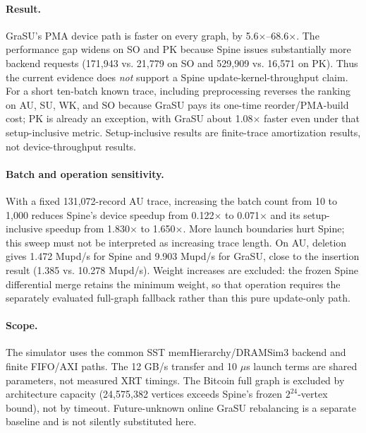 \documentclass[10pt]{article}
\begin{document}
\paragraph{Result.}
GraSU's PMA device path is faster on every graph, by 5.6$\times$--68.6$\times$.
The performance gap widens on SO and PK because Spine issues substantially more
backend requests (171,943 vs. 21,779 on SO and 529,909 vs. 16,571 on PK).  Thus
the current evidence does \emph{not} support a Spine update-kernel-throughput
claim.  For a short ten-batch known trace, including preprocessing reverses the
ranking on AU, SU, WK, and SO because GraSU pays its one-time reorder/PMA-build
cost; PK is already an exception, with GraSU about 1.08$\times$ faster even
under that setup-inclusive metric.  Setup-inclusive results are finite-trace
amortization results, not device-throughput results.

\paragraph{Batch and operation sensitivity.}
With a fixed 131,072-record AU trace, increasing the batch count from 10 to
1,000 reduces Spine's device speedup from 0.122$\times$ to 0.071$\times$ and
its setup-inclusive speedup from 1.830$\times$ to 1.650$\times$.  More launch
boundaries hurt Spine; this sweep must not be interpreted as increasing trace
length.  On AU, deletion gives 1.472 Mupd/s for Spine and 9.903 Mupd/s for
GraSU, close to the insertion result (1.385 vs. 10.278 Mupd/s).  Weight
increases are excluded: the frozen Spine differential merge retains the
minimum weight, so that operation requires the separately evaluated full-graph
fallback rather than this pure update-only path.

\paragraph{Scope.}
The simulator uses the common SST memHierarchy/DRAMSim3 backend and finite
FIFO/AXI paths.  The 12 GB/s transfer and 10 $\mu$s launch terms are shared
parameters, not measured XRT timings.  The Bitcoin full graph is excluded by
architecture capacity (24,575,382 vertices exceeds Spine's frozen
$2^{24}$-vertex bound), not by timeout.  Future-unknown online GraSU rebalancing
is a separate baseline and is not silently substituted here.
\end{document}
